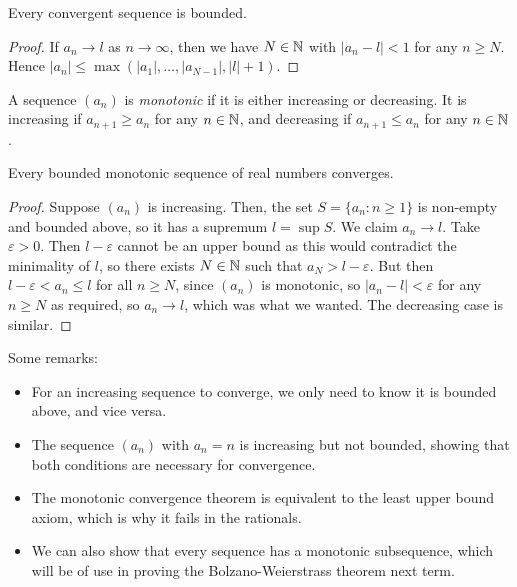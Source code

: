 \documentclass{../../template/note}
\begin{document}
    \begin{proposition}
        Every convergent sequence is bounded.
    \end{proposition}
    
    \begin{proof}
        If \(a_n \to l\) as \(n \to \infty\), then we have \(N \in \mathbb N\) with \(|a_n-l| < 1\) for any \(n \geq N\). Hence \(|a_n| \leq \max(|a_1|, \dots, |a_{N-1}|, |l| + 1)\).
    \end{proof}
    
    \begin{definition}
        A sequence \((a_n)\) is \emph{monotonic} if it is either increasing or decreasing. It is increasing if \(a_{n+1} \geq a_n\) for any \(n \in \mathbb N\), and decreasing if \(a_{n+1} \leq a_n\) for any \(n \in \mathbb N\).
    \end{definition}
    
    \begin{theorem}
        Every bounded monotonic sequence of real numbers converges.
        \label{monotonic-convergence}
    \end{theorem}
    
    \begin{proof}
        Suppose \((a_n)\) is increasing. Then, the set \(S = \{a_n: n \geq 1\}\) is non-empty and bounded above, so it has a supremum \(l = \sup S\). We claim \(a_n \to l\). Take \(\varepsilon > 0\). Then \(l - \varepsilon\) cannot be an upper bound as this would contradict the minimality of \(l\), so there exists \(N \in \mathbb N\) such that \(a_N > l - \varepsilon\). But then \(l-\varepsilon < a_n \leq l\) for all \(n \geq N\), since \((a_n)\) is monotonic, so \(|a_n-l| < \varepsilon\) for any \(n \geq N\) as required, so \(a_n \to l\), which was what we wanted. The decreasing case is similar.
    \end{proof}
    
    \begin{remark*}
        Some remarks:
        \begin{itemize}
            \item For an increasing sequence to converge, we only need to know it is bounded above, and vice versa.
            \item The sequence \((a_n)\) with \(a_n = n\) is increasing but not bounded, showing that both conditions are necessary for convergence.
            \item The monotonic convergence theorem is equivalent to the least upper bound axiom, which is why it fails in the rationals.
            \item We can also show that every sequence has a monotonic subsequence, which will be of use in proving the Bolzano-Weierstrass theorem next term.
        \end{itemize}
    \end{remark*}
    
\end{document}
